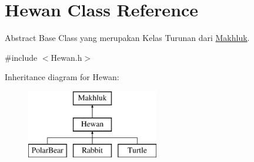 \hypertarget{class_hewan}{}\section{Hewan Class Reference}
\label{class_hewan}


Abstract Base Class yang merupakan Kelas Turunan dari \hyperlink{class_makhluk}{Makhluk}.  




{\ttfamily \#include $<$Hewan.\+h$>$}

Inheritance diagram for Hewan\+:\begin{figure}[H]
\begin{center}
\leavevmode
\includegraphics[height=3.000000cm]{class_hewan}
\end{center}
\end{figure}
